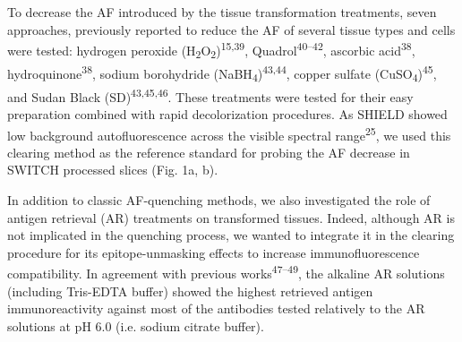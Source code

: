 \documentclass{article}
\begin{document}

To decrease the AF introduced by the tissue transformation treatments, seven approaches, previously reported to reduce the AF of several tissue types and cells were tested: hydrogen peroxide (H\textsubscript{2}O\textsubscript{2})\textsuperscript{15,39}, Quadrol\textsuperscript{40–42}, ascorbic acid\textsuperscript{38}, hydroquinone\textsuperscript{38}, sodium borohydride (NaBH\textsubscript{4})\textsuperscript{43,44}, copper sulfate (CuSO\textsubscript{4})\textsuperscript{45}, and Sudan Black (SD)\textsuperscript{43,45,46}. These treatments were tested for their easy preparation combined with rapid decolorization procedures. As SHIELD showed low background autofluorescence across the visible spectral range\textsuperscript{25}, we used this clearing method as the reference standard for probing the AF decrease in SWITCH processed slices (Fig. 1a, b).

In addition to classic AF-quenching methods, we also investigated the role of antigen retrieval (AR) treatments on transformed tissues. Indeed, although AR is not implicated in the quenching process, we wanted to integrate it in the clearing procedure for its epitope-unmasking effects to increase immunofluorescence compatibility. In agreement with previous works\textsuperscript{47–49}, the alkaline AR solutions (including Tris-EDTA buffer) showed the highest retrieved antigen immunoreactivity against most of the antibodies tested relatively to the AR solutions at pH 6.0 (i.e. sodium citrate buffer).
\end{document}
